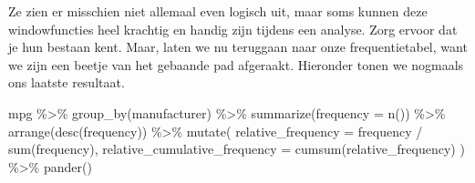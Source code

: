 \documentclass[]{tufte-book}
\newenvironment{Shaded}{}{}
\newcommand{\AttributeTok}[1]{\textcolor[rgb]{0.49,0.56,0.16}{#1}}
\newcommand{\FunctionTok}[1]{\textcolor[rgb]{0.02,0.16,0.49}{#1}}
\newcommand{\NormalTok}[1]{#1}
\newcommand{\SpecialCharTok}[1]{\textcolor[rgb]{0.25,0.44,0.63}{#1}}
\begin{document}
Ze zien er misschien niet allemaal even logisch uit, maar soms kunnen deze windowfuncties heel krachtig en handig zijn tijdens een analyse. Zorg ervoor dat je hun bestaan kent. Maar, laten we nu teruggaan naar onze frequentietabel, want we zijn een beetje van het gebaande pad afgeraakt. Hieronder tonen we nogmaals ons laatste resultaat.

\begin{Shaded}
\begin{Highlighting}[]
\NormalTok{mpg }\SpecialCharTok{\%\textgreater{}\%}
  \FunctionTok{group\_by}\NormalTok{(manufacturer) }\SpecialCharTok{\%\textgreater{}\%}
  \FunctionTok{summarize}\NormalTok{(}\AttributeTok{frequency =} \FunctionTok{n}\NormalTok{()) }\SpecialCharTok{\%\textgreater{}\%}
  \FunctionTok{arrange}\NormalTok{(}\FunctionTok{desc}\NormalTok{(frequency)) }\SpecialCharTok{\%\textgreater{}\%}
  \FunctionTok{mutate}\NormalTok{(}
    \AttributeTok{relative\_frequency =}\NormalTok{ frequency }\SpecialCharTok{/} \FunctionTok{sum}\NormalTok{(frequency),}
    \AttributeTok{relative\_cumulative\_frequency =} \FunctionTok{cumsum}\NormalTok{(relative\_frequency)}
\NormalTok{  ) }\SpecialCharTok{\%\textgreater{}\%}
  \FunctionTok{pander}\NormalTok{()}
\end{Highlighting}
\end{Shaded}
\end{document}
